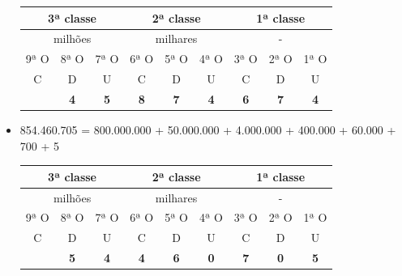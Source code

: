 \begin{itemize}
\begin{table}[H]
\begin{tabular}{|ccc|ccc|ccc|}
\hline
\multicolumn{3}{|c|}{3ª classe} & \multicolumn{3}{c|}{2ª classe} & \multicolumn{3}{c|}{1ª classe} \\ \hline
\multicolumn{3}{|c|}{milhões} & \multicolumn{3}{c|}{milhares} & \multicolumn{3}{c|}{-} \\ \hline
\multicolumn{1}{|c|}{9ª O} & \multicolumn{1}{c|}{8ª O} & 7ª O & \multicolumn{1}{c|}{6ª O} & \multicolumn{1}{c|}{5ª O} & 4ª O & \multicolumn{1}{c|}{3ª O} & \multicolumn{1}{c|}{2ª O} & 1ª O \\ \hline
\multicolumn{1}{|c|}{C} & \multicolumn{1}{c|}{D} & U & \multicolumn{1}{c|}{C} & \multicolumn{1}{c|}{D} & U & \multicolumn{1}{c|}{C} & \multicolumn{1}{c|}{D} & U \\ \hline
\rowcolor[HTML]{FFFC9E} 
\multicolumn{1}{|c|}{\cellcolor[HTML]{FFFC9E}\textbf{}} & \multicolumn{1}{c|}{\cellcolor[HTML]{FFFC9E}\textbf{4}} & \textbf{5} & \multicolumn{1}{c|}{\cellcolor[HTML]{FFFC9E}\textbf{8}} & \multicolumn{1}{c|}{\cellcolor[HTML]{FFFC9E}\textbf{7}} & \textbf{4} & \multicolumn{1}{c|}{\cellcolor[HTML]{FFFC9E}\textbf{6}} & \multicolumn{1}{c|}{\cellcolor[HTML]{FFFC9E}\textbf{7}} & \textbf{4} \\ \hline
\end{tabular}
\end{table}

    \item 854.460.705 = 800.000.000 + 50.000.000 + 4.000.000 + 400.000 + 60.000 + 700 + 5

\begin{table}[H]
\begin{tabular}{|ccc|ccc|ccc|}
\hline
\multicolumn{3}{|c|}{3ª classe} & \multicolumn{3}{c|}{2ª classe} & \multicolumn{3}{c|}{1ª classe} \\ \hline
\multicolumn{3}{|c|}{milhões} & \multicolumn{3}{c|}{milhares} & \multicolumn{3}{c|}{-} \\ \hline
\multicolumn{1}{|c|}{9ª O} & \multicolumn{1}{c|}{8ª O} & 7ª O & \multicolumn{1}{c|}{6ª O} & \multicolumn{1}{c|}{5ª O} & 4ª O & \multicolumn{1}{c|}{3ª O} & \multicolumn{1}{c|}{2ª O} & 1ª O \\ \hline
\multicolumn{1}{|c|}{C} & \multicolumn{1}{c|}{D} & U & \multicolumn{1}{c|}{C} & \multicolumn{1}{c|}{D} & U & \multicolumn{1}{c|}{C} & \multicolumn{1}{c|}{D} & U \\ \hline
\rowcolor[HTML]{FFFC9E} 
\multicolumn{1}{|c|}{\cellcolor[HTML]{FFFC9E}\textbf{8}} & \multicolumn{1}{c|}{\cellcolor[HTML]{FFFC9E}\textbf{5}} & \textbf{4} & \multicolumn{1}{c|}{\cellcolor[HTML]{FFFC9E}\textbf{4}} & \multicolumn{1}{c|}{\cellcolor[HTML]{FFFC9E}\textbf{6}} & \textbf{0} & \multicolumn{1}{c|}{\cellcolor[HTML]{FFFC9E}\textbf{7}} & \multicolumn{1}{c|}{\cellcolor[HTML]{FFFC9E}\textbf{0}} & \textbf{5} \\ \hline
\end{tabular}
\end{table}

\end{itemize}

